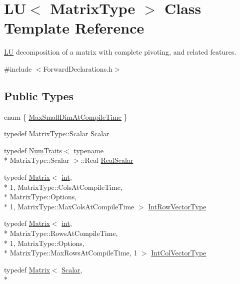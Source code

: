 \hypertarget{class_l_u}{\section{L\-U$<$ Matrix\-Type $>$ Class Template Reference}
\label{class_l_u}
}


\hyperlink{class_l_u}{L\-U} decomposition of a matrix with complete pivoting, and related features.  




{\ttfamily \#include $<$Forward\-Declarations.\-h$>$}

\subsection*{Public Types}
\begin{DoxyCompactItemize}
\item 
enum \{ \hyperlink{class_l_u_af921ac467bc601cae3a94b938d16316ca5bb95a99ba59c9c4221e34926f944fcd}{Max\-Small\-Dim\-At\-Compile\-Time}
 \}
\item 
typedef Matrix\-Type\-::\-Scalar \hyperlink{class_l_u_a2652e625ba82c85391e6cf4c3d821350}{Scalar}
\item 
typedef \hyperlink{struct_num_traits}{Num\-Traits}$<$ typename \\*
Matrix\-Type\-::\-Scalar $>$\-::Real \hyperlink{class_l_u_a2b211092ffd28cd189ea254c951cf8d5}{Real\-Scalar}
\item 
typedef \hyperlink{class_matrix}{Matrix}$<$ \hyperlink{ioapi_8h_a787fa3cf048117ba7123753c1e74fcd6}{int}, \\*
1, Matrix\-Type\-::\-Cols\-At\-Compile\-Time, \\*
Matrix\-Type\-::\-Options, \\*
1, Matrix\-Type\-::\-Max\-Cols\-At\-Compile\-Time $>$ \hyperlink{class_l_u_a8b1b7e093c9203820f5e557b9e0c4edf}{Int\-Row\-Vector\-Type}
\item 
typedef \hyperlink{class_matrix}{Matrix}$<$ \hyperlink{ioapi_8h_a787fa3cf048117ba7123753c1e74fcd6}{int}, \\*
Matrix\-Type\-::\-Rows\-At\-Compile\-Time, \\*
1, Matrix\-Type\-::\-Options, \\*
Matrix\-Type\-::\-Max\-Rows\-At\-Compile\-Time, 1 $>$ \hyperlink{class_l_u_a830b9928b7aed0f3b0147dd0aa6b8f2e}{Int\-Col\-Vector\-Type}
\item 
typedef \hyperlink{class_matrix}{Matrix}$<$ \hyperlink{class_l_u_a2652e625ba82c85391e6cf4c3d821350}{Scalar}, \\*

\end{DoxyCompactItemize}
